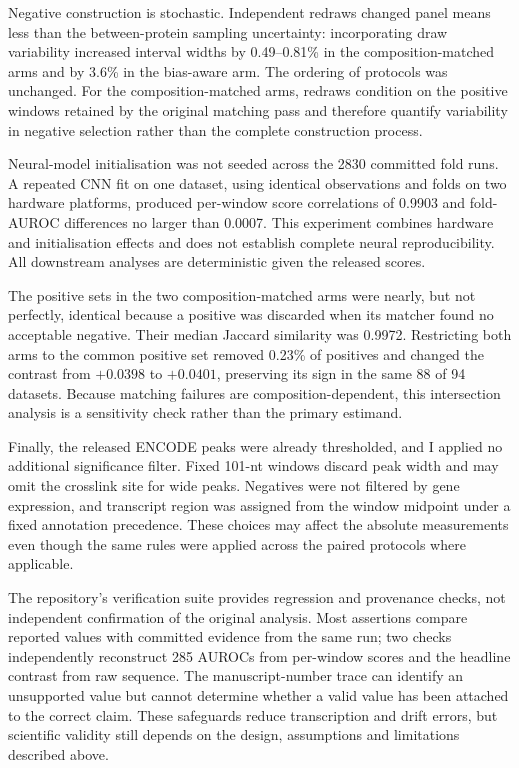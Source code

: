 Negative construction is stochastic. Independent redraws changed panel means less than the
between-protein sampling uncertainty: incorporating draw variability increased interval widths
by 0.49--0.81\% in the composition-matched arms and by 3.6\% in the bias-aware arm. The
ordering of protocols was unchanged. For the composition-matched arms, redraws condition on the
positive windows retained by the original matching pass and therefore quantify variability in
negative selection rather than the complete construction process.

Neural-model initialisation was not seeded across the 2830 committed fold runs. A repeated CNN
fit on one dataset, using identical observations and folds on two hardware platforms, produced
per-window score correlations of 0.9903 and fold-AUROC differences no larger than 0.0007. This
experiment combines hardware and initialisation effects and does not establish complete neural
reproducibility. All downstream analyses are deterministic given the released scores.

The positive sets in the two composition-matched arms were nearly, but not perfectly,
identical because a positive was discarded when its matcher found no acceptable negative. Their
median Jaccard similarity was 0.9972. Restricting both arms to the common positive set removed
0.23\% of positives and changed the contrast from $+0.0398$ to $+0.0401$, preserving its sign
in the same 88 of 94 datasets. Because matching failures are composition-dependent, this
intersection analysis is a sensitivity check rather than the primary estimand.

Finally, the released ENCODE peaks were already thresholded, and I applied no additional
significance filter. Fixed 101-nt windows discard peak width and may omit the crosslink site for
wide peaks. Negatives were not filtered by gene expression, and transcript region was assigned
from the window midpoint under a fixed annotation precedence. These choices may affect the
absolute measurements even though the same rules were applied across the paired protocols where
applicable.

The repository's verification suite provides regression and provenance checks, not independent
confirmation of the original analysis. Most assertions compare reported values with committed
evidence from the same run; two checks independently reconstruct 285 AUROCs from per-window
scores and the headline contrast from raw sequence. The manuscript-number trace can identify an
unsupported value but cannot determine whether a valid value has been attached to the correct
claim. These safeguards reduce transcription and drift errors, but scientific validity still
depends on the design, assumptions and limitations described above.
